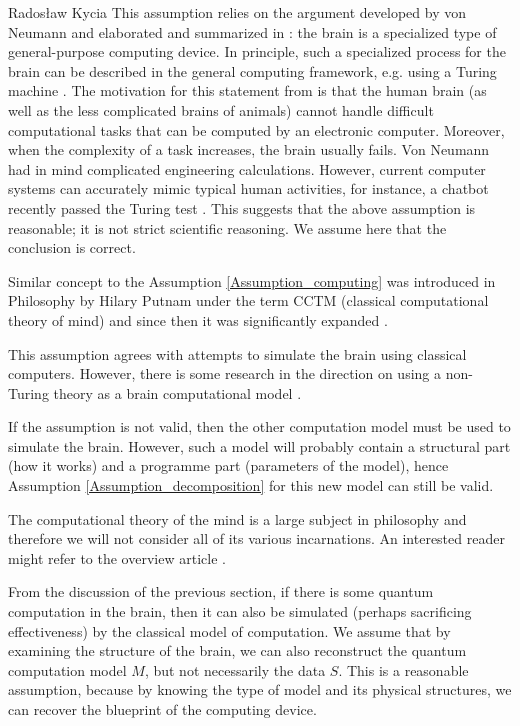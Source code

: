 \begin{artengenv}{Radosław Kycia}
This assumption relies on the argument developed by von Neumann \parencite{NeumannComputerAndTheBrain} and elaborated and summarized in \parencite{KurzweilHowToCreateBrain}: the brain is a specialized type of general-purpose computing device. In principle, such a specialized process for the brain can be described in the general computing framework, e.g. using a Turing machine \parencite{KurzweilHowToCreateBrain}. The motivation for this statement from \parencite{KurzweilHowToCreateBrain} is that the human brain (as well as the less complicated brains of animals) cannot handle difficult computational tasks that can be computed by an electronic computer. Moreover, when the complexity of a task increases, the brain usually fails. Von Neumann had in mind complicated engineering calculations. However, current computer systems can accurately mimic typical human activities, for instance, a chatbot recently passed the Turing test \parencite{PassTuringTest}. This suggests that the above assumption is reasonable; it is not strict scientific reasoning. We assume here that the conclusion is correct.

Similar concept to the Assumption \ref{Assumption_computing} was introduced in Philosophy by Hilary Putnam \parencite*{Putnam} under the term CCTM (classical computational theory of mind) and since then it was significantly expanded \parencite{StanfordEncyclopedyOfPhilosophy_ComputationalMind}.


This assumption agrees with attempts to simulate the brain using classical computers. However, there is some research in the direction on using a non-Turing theory as a brain computational model \parencite{FengComputationaNeuroscience}. 

If the assumption is not valid, then the other computation model must be used to simulate the brain. However, such a model will probably contain a structural part (how it works) and a programme part (parameters of the model), hence Assumption \ref{Assumption_decomposition} for this new model can still be valid. 

The computational theory of the mind is a large subject in philosophy and therefore we will not consider all of its various incarnations. An interested reader might refer to the overview article \parencite{StanfordEncyclopedyOfPhilosophy_ComputationalMind}.


From the discussion of the previous section, if there is some quantum computation in the brain, then it can also be simulated (perhaps sacrificing effectiveness) by the classical model of computation. We assume that by examining the structure of the brain, we can also reconstruct the quantum computation model $M$, but not necessarily the data $S$. This is a reasonable assumption, because by knowing the type of model and its physical structures, we can recover the blueprint of the computing device.



\end{artengenv}
